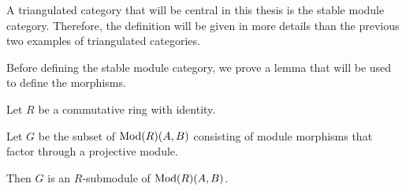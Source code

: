 
A triangulated category that will be central in this thesis is the stable module category. Therefore, the definition will be given in more details than the previous two examples of triangulated categories.

Before defining the stable module category, we prove a lemma that will be used to define the morphisms.
\begin{lemma}
    \label{lem:morphisms_factoring_through_projectives_r-submodule}
    Let \( R \) be a commutative ring with identity.

    Let \( G \) be the subset of \( \operatorname{Mod}(R)(A, B) \) consisting of module morphisms that factor through a projective module.

    Then \( G \) is an \( R \)-submodule of \( \operatorname{Mod}(R)(A, B) \).
\end{lemma}
